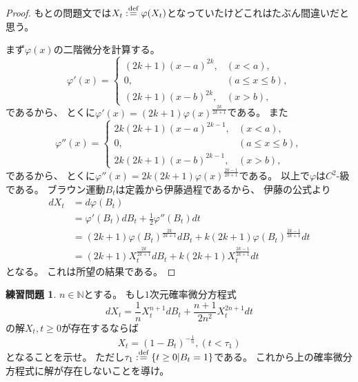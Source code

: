 \documentclass[uplatex]{jsarticle}
\theoremstyle{definition}
\newtheorem{prob}[prob]{練習問題}
\def\N{\mathbb{N}}
\def\dfn{:\overset{\mbox{{\scriptsize def}}}{=}}
\begin{document}
\begin{proof}
  もとの問題文では\(X_t \dfn \varphi(X_t)\)となっていたけどこれはたぶん間違いだと思う。

  まず\(\varphi(x)\)の二階微分を計算する。
  \[
  \varphi'(x) =
  \begin{cases}
    (2k+1)(x-a)^{2k}, &(x < a), \\
    0, &(a\leq x \leq b), \\
    (2k+1)(x-b)^{2k}, &(x > b),
  \end{cases}
  \]
  であるから、
  とくに\(\varphi'(x) = (2k+1)\varphi(x)^{\frac{2k}{2k+1}}\)である。
  また
  \[
  \varphi''(x) =
  \begin{cases}
    2k(2k+1)(x-a)^{2k-1}, &(x < a), \\
    0, &(a\leq x \leq b), \\
    2k(2k+1)(x-b)^{2k-1}, &(x > b),
  \end{cases}
  \]
  であるから、
  とくに\(\varphi''(x) = 2k(2k+1)\varphi(x)^{\frac{2k-1}{2k+1}}\)である。
  以上で\(\varphi\)は\(C^2\)-級である。
  ブラウン運動\(B_t\)は定義から伊藤過程であるから、
  伊藤の公式より
  \begin{align*}
    dX_t
    &= d\varphi(B_t) \\
    &= \varphi'(B_t)dB_t + \frac{1}{2}\varphi''(B_t)dt \\
    &= (2k+1)\varphi(B_t)^{\frac{2k}{2k+1}}dB_t
    + k(2k+1)\varphi(B_t)^{\frac{2k-1}{2k+1}}dt \\
    &= (2k+1)X_t^{\frac{2k}{2k+1}}dB_t
    + k(2k+1)X_t^{\frac{2k-1}{2k+1}}dt
  \end{align*}
  となる。
  これは所望の結果である。
\end{proof}











\begin{prob}\label{prob: 5.2}
  \(n\in \N\)とする。
  もし\(1\)次元確率微分方程式
  \[
  dX_t = \frac{1}{n}X_t^{n+1}dB_t + \frac{n+1}{2n^2}X_t^{2n+1}dt
  \]
  の解\(X_t, t\geq 0\)が存在するならば
  \[
  X_t = (1-B_t)^{-\frac{1}{n}} , (t < \tau_1)
  \]
  となることを示せ。
  ただし\(\tau_1 \dfn \left\{ t\geq 0\middle| B_t = 1\right\}\)である。
  これから上の確率微分方程式に解が存在しないことを導け。
\end{prob}
\end{document}
